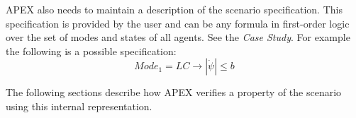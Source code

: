 APEX also needs to maintain a description of the scenario specification.
This specification is provided by the user and can be any formula in first-order logic over the set of modes and states of all agents. 
See the \emph{Case Study}.%
For example the following is a possible specification:
\[Mode_1 = LC \to |\dot{\psi}| \leq b \]

The following sections describe how APEX verifies a property of the scenario using this internal representation.





